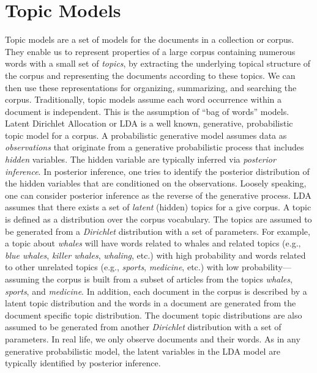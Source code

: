 \section{Topic Models}


Topic models are a set of models for the documents in a collection 
or corpus. They enable us to represent properties of a large 
corpus containing numerous words with a small set of \textsl{topics}, 
by extracting the underlying topical structure of the corpus and 
representing the documents according to these topics. We can then 
use these representations for organizing, summarizing, and searching 
the corpus. Traditionally, topic models assume each word occurrence 
within a document is independent. This is the assumption of ``bag of 
words'' models. Latent Dirichlet Allocation or LDA 
\cite{Blei2003} is a well known, generative, probabilistic   
topic model for a corpus. A probabilistic generative model assumes 
data as \textsl{observations} that originate from a generative 
probabilistic process that includes \textsl{hidden} variables. The 
hidden variable are typically inferred via \textsl{posterior 
inference}. In posterior inference, one tries to identify the posterior 
distribution of the hidden variables that are conditioned on the observations. 
Loosely speaking, one can consider posterior inference as the 
reverse of the generative process. LDA assumes 
that there exists a set of \textsl{latent} (hidden) topics for a 
give corpus. A topic is defined as a distribution over the corpus 
vocabulary. The topics are assumed to be generated from a 
\textsl{Dirichlet} distribution with a set of parameters. For 
example, a topic about \textit{whales} will have words related to 
whales and related topics (e.g., \textit{blue whales}, \textit{killer whales}, 
\textit{whaling}, etc.) with high probability and words related to 
other unrelated topics (e.g., \textit{sports}, \textit{medicine}, 
etc.) with low probability---assuming the corpus is built from a 
subset of articles from the topics \textit{whales}, \textit{sports}, and 
\textit{medicine}. In addition, each document in the corpus is 
described by a latent topic distribution and the words in a document 
are generated from the document specific topic distribution. The 
document topic distributions 
are also assumed to be generated from another \textsl{Dirichlet} 
distribution with a set of parameters. In real life, we only observe 
documents and their words. As in any generative probabilistic model, 
the latent variables in the LDA model are typically identified by 
posterior inference. 

